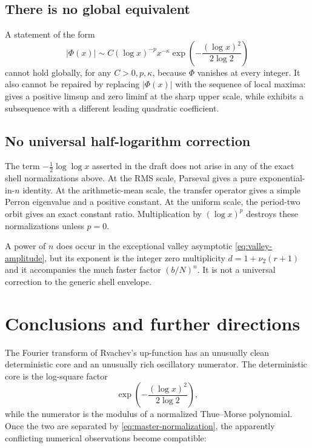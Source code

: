 \documentclass[11pt,oneside]{article}
\theoremstyle{definition}
\theoremstyle{remark}
\newcommand{\Phiup}{\Phi}
\newcommand{\vtwo}{\nu_2}
\newcommand{\abs}[1]{\left|#1\right|}
\begin{document}
\subsection{There is no global equivalent}

A statement of the form
\[
 \abs{\Phiup(x)}\sim C(\log x)^{-p}x^{-\kappa}
 \exp\!\left(-\frac{(\log x)^2}{2\log2}\right)
\]
cannot hold globally, for any $C>0,p,\kappa$, because $\Phiup$ vanishes at every integer.
It also cannot be repaired by replacing $\abs{\Phiup(x)}$ with the sequence of local maxima:
 gives a positive limsup and zero liminf at the sharp upper
scale, while  exhibits a subsequence with a different leading
quadratic coefficient.

\subsection{No universal half-logarithm correction}

The term $-\tfrac12\log\log x$ asserted in the draft does not arise in any of the exact
shell normalizations above.  At the RMS scale, Parseval gives a pure exponential-in-$n$
identity.  At the arithmetic-mean scale, the transfer operator gives a simple Perron
eigenvalue and a positive constant.  At the uniform scale, the period-two orbit gives an
exact constant ratio.  Multiplication by $(\log x)^p$ destroys these normalizations unless
$p=0$.

A power of $n$ does occur in the exceptional valley asymptotic
\eqref{eq:valley-amplitude}, but its exponent is the integer zero multiplicity
$d=1+\vtwo(r+1)$ and it accompanies the much faster factor $(b/N)^n$.  It is not a universal
correction to the generic shell envelope.

\section{Conclusions and further directions}
\label{sec:conclusion}

The Fourier transform of Rvachev's up-function has an unusually clean deterministic core
and an unusually rich oscillatory numerator.  The deterministic core is the log-square
factor
\[
 \exp\!\left(-\frac{(\log x)^2}{2\log2}\right),
\]
while the numerator is the modulus of a normalized Thue--Morse polynomial.  Once the two
are separated by \eqref{eq:master-normalization}, the apparently conflicting numerical
observations become compatible:
\end{document}
